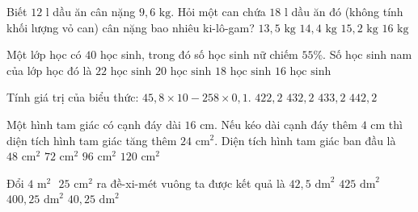\begin{ex} %
Biết $12\text{ l}$ dầu ăn cân nặng $9{,}6\text{ kg}$. Hỏi một can chứa $18\text{ l}$ dầu ăn đó (không tính khối lượng vỏ can) cân nặng bao nhiêu ki-lô-gam?
\choice
{$13{,}5\text{ kg}$}
{\True $14{,}4\text{ kg}$}
{$15{,}2\text{ kg}$}
{$16\text{ kg}$}
\end{ex}

\begin{ex} %
Một lớp học có $40$ học sinh, trong đó số học sinh nữ chiếm $55\%$. Số học sinh nam của lớp học đó là
\choice
{$22\text{ học sinh}$}
{$20\text{ học sinh}$}
{\True $18\text{ học sinh}$}
{$16\text{ học sinh}$}
\end{ex}

\begin{ex} %
Tính giá trị của biểu thức: $45{,}8 \times 10 - 258 \times 0{,}1$.
\choice
{$422{,}2$}
{\True $432{,}2$}
{$433{,}2$}
{$442{,}2$}
\end{ex}

\begin{ex} %
Một hình tam giác có cạnh đáy dài $16\text{ cm}$. Nếu kéo dài cạnh đáy thêm $4\text{ cm}$ thì diện tích hình tam giác tăng thêm $24\text{ cm}^2$. Diện tích hình tam giác ban đầu là
\choice
{$48\text{ cm}^2$}
{$72\text{ cm}^2$}
{\True $96\text{ cm}^2$}
{$120\text{ cm}^2$}
\end{ex}

\begin{ex} %
Đổi $4\text{ m}^2\text{ }25\text{ cm}^2$ ra đề-xi-mét vuông ta được kết quả là
\choice
{$42{,}5\text{ dm}^2$}
{$425\text{ dm}^2$}
{\True $400{,}25\text{ dm}^2$}
{$40{,}25\text{ dm}^2$}
\end{ex}

